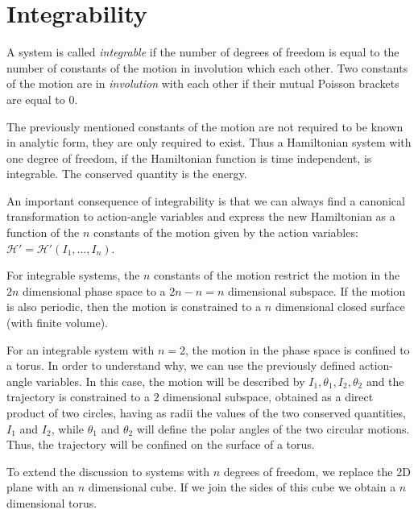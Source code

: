 \documentclass[../thesis.tex]{subfiles}
\theoremstyle{plain}
\begin{document}
\section{Integrability}

A system is called \emph{integrable} if the number of degrees of freedom is equal to the number
of constants of the motion in involution which each other. Two constants of the motion
are in \emph{involution} with each other if their mutual Poisson brackets are equal to \(0\).

The previously mentioned constants of the motion are not required to be known in analytic form,
they are only required to exist. Thus a Hamiltonian system with one degree of
freedom, if the Hamiltonian function is time independent, is integrable.
The conserved quantity is the energy.

An important consequence of integrability is that we can always find a canonical
transformation to action-angle variables and express the new Hamiltonian as a function
of the \(n\) constants of the motion given by the action variables:
\(\mathcal{H'}=\mathcal{H'}(I_1,\dotsc,I_n)\).

For integrable systems, the \(n\) constants of the motion restrict the motion in the
\(2n\) dimensional phase space to a \(2n-n=n\) dimensional subspace. If the motion is
also periodic, then the motion is constrained to a \(n\) dimensional closed surface
(with finite volume).

For an integrable system with \(n=2\), the motion in the phase space is confined
to a torus. In order to understand why, we can use the previously defined action-angle variables.
In this case, the motion will be described by \(I_1, \theta_1, I_2, \theta_2\) and
the trajectory is constrained to a \(2\) dimensional subspace, obtained as a direct
product of two circles, having as radii the values of the two conserved quantities,
\(I_1\) and \(I_2\), while \(\theta_1\) and \(\theta_2\) will define the polar angles
of the two circular motions. Thus, the trajectory will be confined on the surface
of a torus.

To extend the discussion to systems with \(n\) degrees of freedom,
we replace the 2D plane with an \(n\) dimensional cube. If we join the sides of
this cube we obtain a \(n\) dimensional torus.

%
\end{document}
